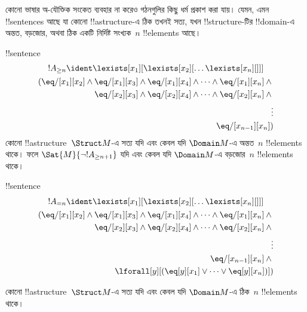\documentclass[../../../include/open-logic-section]{subfiles}
\begin{document}


\begin{explain}
কোনো ভাষার অ-যৌক্তিক সংকেত ব্যবহার না করেও গঠনগুলির কিছু ধর্ম
প্রকাশ করা যায়। যেমন, এমন !!{sentence}s আছে যা কোনো
!!a{structure}-এ ঠিক তখনই সত্য, যখন !!{structure}-টির !!{domain}-এ
অন্তত, বড়জোর, অথবা ঠিক একটি নির্দিষ্ট সংখ্যক~$n$ !!{element}s আছে।
\end{explain}

\begin{prop}
!!{sentence}
\begin{multline*}
  !A_{\ge n} \ident \lexists[x_1][\lexists[x_2][\dots\lexists[x_n][{}]]]\\
  \begin{aligned}
  (\eq/[x_1][x_2] \land {}
  \eq/[x_1][x_3] \land \eq/[x_1][x_4] \land \dots \land \eq/[x_1][x_n] \land {}\\
\eq/[x_2][x_3] \land \eq/[x_2][x_4] \land \dots \land {} \eq/[x_2][x_n] \land {} \\
\vdots\\
\eq/[x_{n-1}][x_n])
\end{aligned}
\end{multline*}
কোনো !!a{structure}~$\Struct M$-এ সত্য যদি এবং কেবল যদি
$\Domain M$-এ অন্তত~$n$ !!{element}s থাকে। ফলে
$\Sat{M}{\lnot !A_{\ge n+1}}$ যদি এবং কেবল যদি $\Domain M$-এ
বড়জোর~$n$ !!{element}s থাকে।

\end{prop}

\begin{prop}
!!{sentence}
\begin{multline*}
!A_{= n} \ident \lexists[x_1][\lexists[x_2][\dots\lexists[x_n][{}]]] \\
\begin{aligned}
  (\eq/[x_1][x_2] \land {}
  \eq/[x_1][x_3] \land \eq/[x_1][x_4] \land \dots \land \eq/[x_1][x_n] \land {}\\
\eq/[x_2][x_3] \land \eq/[x_2][x_4] \land \dots \land {} \eq/[x_2][x_n] \land {} \\
\vdots\\
\eq/[x_{n-1}][x_n] \land {} \\
\lforall[y][(\eq[y][x_1] \lor \dots \lor \eq[y][x_n])])
\end{aligned}
\end{multline*}

কোনো !!a{structure}~$\Struct M$-এ সত্য যদি এবং কেবল যদি
$\Domain M$-এ ঠিক~$n$ !!{element}s থাকে।
\end{prop}
\end{document}
